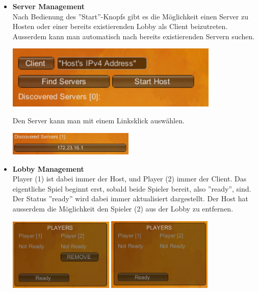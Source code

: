 \begin{itemize}
\begin {itemize}
        \item \textbf{Server Management}\\
            Nach Bedienung des ''Start''-Knopfs gibt es die Möglichkeit einen Server zu Hosten oder einer bereits existierenden Lobby als Client beizutreten. Ausserdem kann man
            automatisch nach bereits existierenden Servern suchen.
            \begin{center}
                \includegraphics*[height = 3cm]{resources/server.png}\\
            \end{center}
            Den Server kann man mit einem Linksklick auswählen.
            \begin{center}
                \includegraphics*[width=6cm]{resources/discovered.png}\\
            \end{center}
            
        \item \textbf{Lobby Management}\\
            Player (1) ist dabei immer der Host, und Player (2) immer der Client. Das eigentliche Spiel beginnt erst, sobald beide Spieler bereit, also ''ready'', sind. 
            Der Status ''ready'' wird dabei immer aktualisiert dargestellt. Der Host hat ausserdem die Möglichkeit den Spieler (2) aus der Lobby zu entfernen. 
            \begin{center}
                \includegraphics*[width = 5cm]{resources/lobby.png} \includegraphics*[width=5cm]{resources/lobbyc.png}\\ 
            \end{center}
            

\end{itemize}
\end{itemize}
